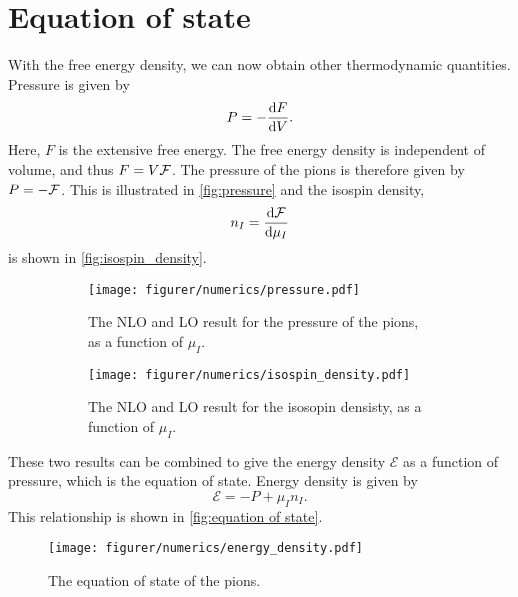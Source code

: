 \section{Equation of state}
With the free energy density, we can now obtain other thermodynamic quantities.
Pressure is given by
\begin{equation}
    P = - \diff{F}{V}.
\end{equation}
Here, $F$ is the extensive free energy.
The free energy density is independent of volume, and thus $F = V \mathcal{F}$.
The pressure of the pions is therefore given by $P = -\mathcal{F}$.
This is illustrated in \autoref{fig:pressure}
and the isospin density, 
\begin{equation}
    n_I = \diff{\Ef}{\mu_I}
\end{equation}
is shown in \autoref{fig:isospin_density}.
\begin{figure}[ht]
    \centering
    \begin{subfigure}{0.49\textwidth}
        \texttt{[image: figurer/numerics/pressure.pdf]}
        \caption{The NLO and LO result for the pressure of the pions, as a function of $\mu_I$.}
        \label{fig:pressure}
    \end{subfigure}
    \begin{subfigure}{0.49\textwidth}
        \texttt{[image: figurer/numerics/isospin\_density.pdf]}
        \caption{The NLO and LO result for the isosopin densisty, as a function of $\mu_I$.}
        \label{fig:isospin_density}
    \end{subfigure}
    \caption{}
\end{figure}

These two results can be combined to give the energy density $\mathcal{E}$ as a function of pressure, which is the equation of state.
Energy density is given by 
\begin{equation}
    \mathcal{E} = -P + \mu_I n_I.
\end{equation}
This relationship is shown in \autoref{fig:equation of state}.

\begin{figure}[ht]
    \centering
    \texttt{[image: figurer/numerics/energy\_density.pdf]}
    \caption{The equation of state of the pions.}
    \label{fig:equation of state}
\end{figure}
